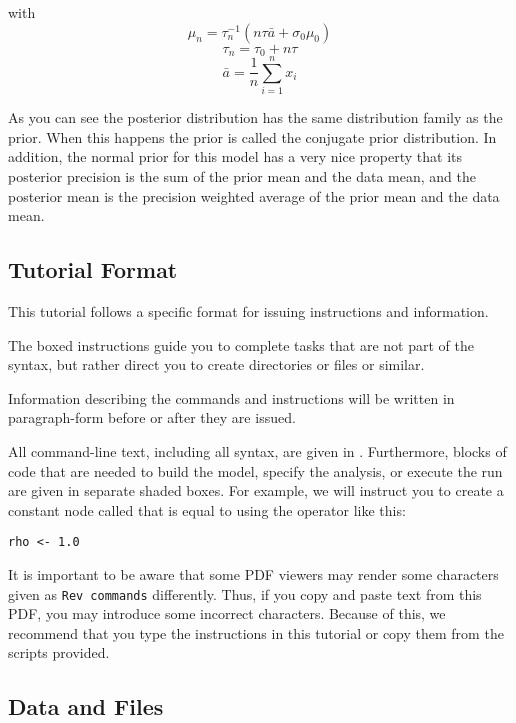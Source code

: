 with
\[ \mu_n = \tau_n^{-1} (n\tau \bar{a} + \sigma_0 \mu_0) \]
   \[\tau_n = \tau_0 + n\tau \]
   \[\bar{a} = \frac{1}{n}\sum_{i=1}^{n} x_i\]

As you can see the posterior distribution has the same distribution family as the prior. When this happens the prior is called the conjugate prior distribution. In addition, the normal prior for this model has a very nice property that its posterior precision is the sum of the prior mean and the data mean, and the posterior mean is the precision weighted average of the prior mean and the data mean.


\medskip
\subsection{Tutorial Format}\label{subsect:Exercise-Format}

This tutorial follows a specific format for issuing instructions and information.

{\begin{framed}
The boxed instructions guide you to complete tasks that are not part of the \RevBayes syntax, but rather direct you to create directories or files or similar.
\end{framed}}

Information describing the commands and instructions will be written in paragraph-form before or after they are issued.

All command-line text, including all \Rev syntax, are given in . 
Furthermore, blocks of \Rev code that are needed to build the model, specify the analysis, or execute the run are given in separate shaded boxes.
For example, we will instruct you to create a constant node called  that is equal to  using the \cl{<-} operator like this:
{\tt \begin{snugshade*}
\begin{lstlisting}
rho <- 1.0
\end{lstlisting}
\end{snugshade*}}

It is important to be aware that some PDF viewers may render some characters given as \colorbox{shadecolor}{\tt{Rev commands}} differently. 
Thus, if you copy and paste text from this PDF, you may introduce some incorrect characters. 
Because of this, we recommend that you type the instructions in this tutorial or copy them from the scripts provided. 


\medskip
\subsection{Data and Files}\label{subsect:Exercise-DataFiles}

